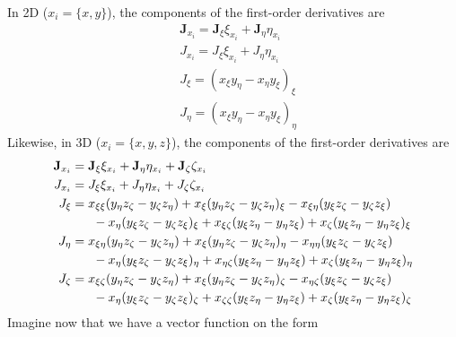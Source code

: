 \documentclass{article}
\begin{document}
In 2D ($x_i = \{x,y\}$), the components of the first-order derivatives are
\begin{subequations}
\begin{align}
&\mathbf{J}_{x_i} = \mathbf{J}_{\xi}\xi_{x_i} + \mathbf{J}_{\eta}\eta_{x_i} \\
&J_{x_i} = J_{\xi}\xi_{x_i}+J_{\eta}\eta_{x_i} \\
&J_{\xi} = (x_{\xi}y_{\eta}-x_{\eta}y_{\xi})_{\xi} \\
&J_{\eta} = (x_{\xi}y_{\eta}-x_{\eta}y_{\xi})_{\eta}
\end{align}
\end{subequations}
Likewise, in 3D ($x_i = \{x,y,z\}$), the components of the first-order derivatives are
\begin{subequations}
\begin{align}
\mathbf{J}_{x_i}	&= \mathbf{J}_{\xi}\xi_{x_i} + \mathbf{J}_{\eta}\eta_{x_i}+ \mathbf{J}_{\zeta}\zeta_{x_i} \\
J_{x_i} 		&= J_{\xi}\xi_{x_i}+J_{\eta}\eta_{x_i}+J_{\zeta}\zeta_{x_i} \\
J_{\xi} 		&= x_{\xi\xi}(y_{\eta}z_{\zeta}-y_{\zeta}z_{\eta})+x_{\xi}(y_{\eta}z_{\zeta}-y_{\zeta}z_{\eta})_{\xi}-x_{\xi\eta}(y_{\xi}z_{\zeta}-y_{\zeta}z_{\xi}) \notag \\
			&\hspace{6mm}-x_{\eta}(y_{\xi}z_{\zeta}-y_{\zeta}z_{\xi})_{\xi}+x_{\xi\zeta}(y_{\xi}z_{\eta}-y_{\eta}z_{\xi})+x_{\zeta}(y_{\xi}z_{\eta}-y_{\eta}z_{\xi})_{\xi} \\
J_{\eta}		&= x_{\xi\eta}(y_{\eta}z_{\zeta}-y_{\zeta}z_{\eta})+x_{\xi}(y_{\eta}z_{\zeta}-y_{\zeta}z_{\eta})_{\eta}-x_{\eta\eta}(y_{\xi}z_{\zeta}-y_{\zeta}z_{\xi}) \notag \\
			&\hspace{6mm}-x_{\eta}(y_{\xi}z_{\zeta}-y_{\zeta}z_{\xi})_{\eta}+x_{\eta\zeta}(y_{\xi}z_{\eta}-y_{\eta}z_{\xi})+x_{\zeta}(y_{\xi}z_{\eta}-y_{\eta}z_{\xi})_{\eta} \\
J_{\zeta}		&= x_{\xi\zeta}(y_{\eta}z_{\zeta}-y_{\zeta}z_{\eta})+x_{\xi}(y_{\eta}z_{\zeta}-y_{\zeta}z_{\eta})_{\zeta}-x_{\eta\zeta}(y_{\xi}z_{\zeta}-y_{\zeta}z_{\xi}) \notag \\
			&\hspace{6mm}-x_{\eta}(y_{\xi}z_{\zeta}-y_{\zeta}z_{\xi})_{\zeta}+x_{\zeta\zeta}(y_{\xi}z_{\eta}-y_{\eta}z_{\xi})+x_{\zeta}(y_{\xi}z_{\eta}-y_{\eta}z_{\xi})_{\zeta}
\end{align}
\end{subequations}
Imagine now that we have a vector function on the form
\end{document}
